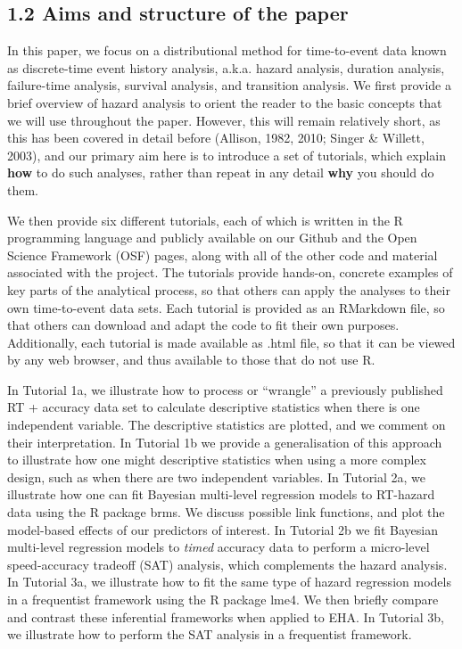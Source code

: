 \documentclass[
  man,floatsintext]{apa6}
\begin{document}
\subsection{1.2 Aims and structure of the paper}\label{aims-and-structure-of-the-paper}

In this paper, we focus on a distributional method for time-to-event data known as discrete-time event history analysis, a.k.a. hazard analysis, duration analysis, failure-time analysis, survival analysis, and transition analysis.
We first provide a brief overview of hazard analysis to orient the reader to the basic concepts that we will use throughout the paper. However, this will remain relatively short, as this has been covered in detail before (Allison, 1982, 2010; Singer \& Willett, 2003), and our primary aim here is to introduce a set of tutorials, which explain \textbf{how} to do such analyses, rather than repeat in any detail \textbf{why} you should do them.

We then provide six different tutorials, each of which is written in the R programming language and publicly available on our Github and the Open Science Framework (OSF) pages, along with all of the other code and material associated with the project. The tutorials provide hands-on, concrete examples of key parts of the analytical process, so that others can apply the analyses to their own time-to-event data sets. Each tutorial is provided as an RMarkdown file, so that others can download and adapt the code to fit their own purposes. Additionally, each tutorial is made available as .html file, so that it can be viewed by any web browser, and thus available to those that do not use R.

In Tutorial 1a, we illustrate how to process or ``wrangle'' a previously published RT + accuracy data set to calculate descriptive statistics when there is one independent variable. The descriptive statistics are plotted, and we comment on their interpretation. In Tutorial 1b we provide a generalisation of this approach to illustrate how one might descriptive statistics when using a more complex design, such as when there are two independent variables. In Tutorial 2a, we illustrate how one can fit Bayesian multi-level regression models to RT-hazard data using the R package brms. We discuss possible link functions, and plot the model-based effects of our predictors of interest. In Tutorial 2b we fit Bayesian multi-level regression models to \emph{timed} accuracy data to perform a micro-level speed-accuracy tradeoff (SAT) analysis, which complements the hazard analysis. In Tutorial 3a, we illustrate how to fit the same type of hazard regression models in a frequentist framework using the R package lme4. We then briefly compare and contrast these inferential frameworks when applied to EHA. In Tutorial 3b, we illustrate how to perform the SAT analysis in a frequentist framework.
\end{document}
